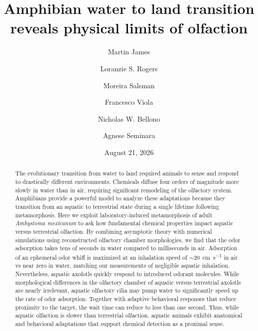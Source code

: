 \documentclass[%
 twocolumn,
 amsmath,amssymb,
 aps,prfluids,
 superscriptaddress,
]{revtex4-2}
\begin{document}
\title{Amphibian water to land transition reveals physical limits of olfaction}

\author{Martin James}
\author{Loranzie S. Rogers}
\author{Moreira Salsman}
\author{Francesco Viola}
\author{Nicholas W. Bellono}
\author{Agnese Seminara}

\date{August 21, 2026}

\begin{abstract}
The evolutionary transition from water to land required animals to sense and respond to drastically different environments. Chemicals diffuse four orders of magnitude more slowly in water than in air, requiring significant remodeling of the olfactory system. Amphibians provide a powerful model to analyze these adaptations because they transition from an aquatic to terrestrial state during a single lifetime following metamorphosis. Here we exploit laboratory-induced metamorphosis of adult \textit{Ambystoma mexicanum} to ask how fundamental chemical properties impact aquatic versus terrestrial olfaction. By combining asymptotic theory with numerical simulations using reconstructed olfactory chamber morphologies, we find that the odor adsorption takes tens of seconds in water compared to milliseconds in air. Adsorption of an ephemeral odor whiff is maximized at an inhalation speed of $\sim$\SI{20}{\centi\meter\per\second} in air vs near zero in water, matching our measurements of negligible aquatic inhalation. Nevertheless, aquatic axolotls quickly respond to introduced odorant molecules. While morphological differences in the olfactory chamber of aquatic versus terrestrial axolotls are nearly irrelevant, aquatic olfactory cilia may pump water to significantly speed up the rate of odor adsorption. Together with adaptive behavioral responses that reduce proximity to the target, the wait time can reduce to less than one second. Thus, while aquatic olfaction is slower than terrestrial olfaction, aquatic animals exhibit anatomical and behavioral adaptations that support chemical detection as a proximal sense. 
\end{abstract}
\end{document}
